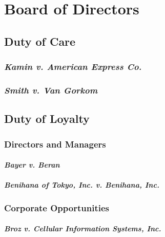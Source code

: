 \section{Board of Directors} %

\subsection{Duty of Care}

\subsubsection{\emph{Kamin v. American Express Co.}}


\subsubsection{\emph{Smith v. Van Gorkom}}


\subsection{Duty of Loyalty}

\subsubsection{Directors and Managers}

\paragraph{\emph{Bayer v. Beran}}


\paragraph{\emph{Benihana of Tokyo, Inc. v. Benihana, Inc.}}


\subsubsection{Corporate Opportunities}

\paragraph{\emph{Broz v. Cellular Information Systems, Inc.}}

